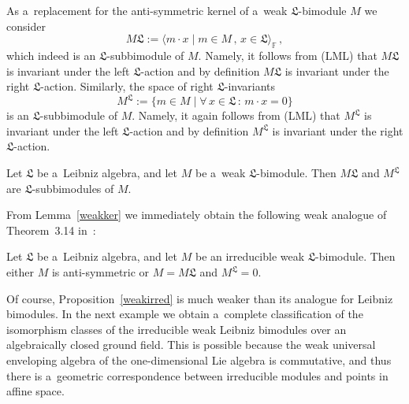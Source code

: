 \documentclass{jonasart}
\newcommand{\fbb}{\mathbb{F}}
\newcommand{\lf}{\mathfrak{L}}
\begin{document}
	As a~replacement for the anti-symmetric kernel of a~weak $\lf$-bimodule
	$M$ we consider
	\[
		M\lf:=\langle m\cdot x\mid m\in M\,,\,x\in\lf\rangle_\fbb\,,
	\]
	which indeed is an $\lf$-subbimodule of $M$. Namely, it follows from
	(LML) that $M\lf$ is invariant under the left $\lf$-action and by definition
	$M\lf$ is invariant under the right $\lf$-action. Similarly, the space of right
	$\lf$-invariants
	\[
		M^\lf:=\{m\in M\mid\forall\,x\in\lf\,:\,m\cdot x=0\}
	\]
	is an $\lf$-subbimodule of $M$. Namely, it again follows from (LML)
	that $M^\lf$ is invariant under the left $\lf$-action and by definition
	$M^\lf$ is invariant under the right $\lf$-action.
	\begin{lemma}\label{weakker}
		Let $\lf$ be a~Leibniz algebra, and let $M$ be a~weak $\lf$-bimodule. Then $M\lf$ and $M^\lf$ are $\lf$-subbimodules of $M$.
	\end{lemma}
	From Lemma~\ref{weakker} we immediately obtain the following weak analogue of Theorem~3.14 in~\cite{F1}:
	\begin{proposition}\label{weakirred}
		Let $\lf$ be a~Leibniz algebra, and let $M$ be an irreducible weak
		$\lf$-bimodule. Then either $M$ is anti-symmetric or $M=M\lf$ and
		$M^\lf=0$.
	\end{proposition}
	Of course, Proposition~\ref{weakirred} is much weaker than its analogue for Leibniz bimodules. In the next example we obtain a~complete classification of the isomorphism classes of the irreducible weak Leibniz bimodules over an algebraically closed ground field. This is possible because the weak universal enveloping algebra of the one-dimensional Lie algebra is commutative, and thus there is a~geometric correspondence between irreducible modules and points in affine space.
\end{document}
